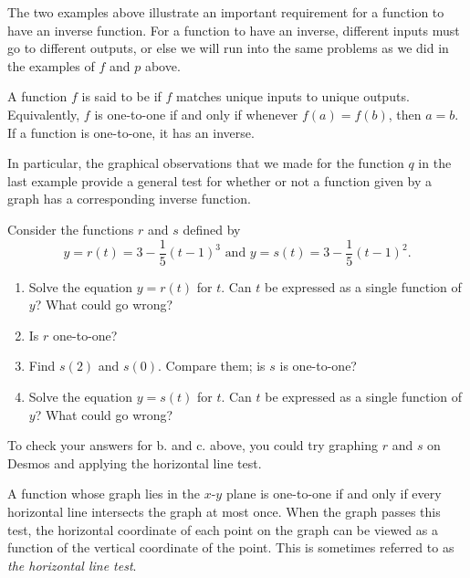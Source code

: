 \documentclass[nooutcomes]{ximera}
\begin{document}
The two examples above illustrate an important requirement for a function to have an inverse function. For a function to have an inverse, different inputs must go to different outputs, or else we will run into the same problems as we did in the examples of $f$ and $p$ above.

\begin{definition}
A function $f$ is said to be   if $f$ matches unique inputs to unique
outputs. Equivalently, $f$ is one-to-one if and only if whenever $f(a) = f(b)$, then $a = b$. If a function is one-to-one, it has an inverse.
\end{definition}

In particular, the graphical observations that we made for the function $q$ in the last example provide a general test for whether or not a function given by a graph has a corresponding inverse function. 

\begin{exploration}
Consider the functions $r$ and $s$ defined by
$$
y = r(t) = 3 - \frac{1}{5}(t-1)^3 \text{ and } y = s(t) = 3 - \frac{1}{5}(t-1)^2.
$$


\begin{enumerate}[label=\alph*.]
\item Solve the equation $y = r(t)$ for $t$. Can $t$ be expressed as a single function of $y$? What could go wrong?
\item Is $r$ one-to-one?
\item Find $s(2)$ and $s(0)$. Compare them; is $s$ is one-to-one?
\item Solve the equation $y = s(t)$ for $t$. Can $t$ be expressed as a single function of $y$? What could go wrong?
\end{enumerate}
\end{exploration}

To check your answers for b. and c. above, you could try graphing $r$ and $s$ on Desmos and applying the horizontal line test. 
\begin{remark}
A function whose graph lies in the $x$-$y$ plane is one-to-one if and only if every horizontal line intersects the graph at most once.  When the graph passes this test, the horizontal coordinate of each point on the graph can be viewed as a function of the vertical coordinate of the point. This is sometimes referred to as \emph{the horizontal line test}.
\end{remark}
\end{document}
